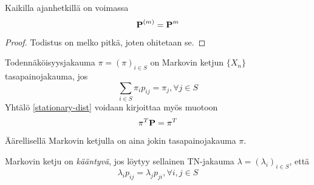 \begin{lause}
	Kaikilla ajanhetkillä on voimassa
	\begin{equation}
		\textbf{P} ^{(m)} = \textbf{P} ^m
	\end{equation}
\end{lause}
\begin{proof}
	Todistus on melko pitkä, joten ohitetaan se.
\end{proof}

\begin{maar}
	Todennäköisyysjakauma $\pi=(\pi)_{i\in S}$ on Markovin ketjun $\{X_n\}$ tasapainojakauma, jos 
	\begin{equation}\label{stationary-dist}
		\sum_{i\in S} \pi_i p_{ij}=\pi_j, \forall j\in S
	\end{equation}
	Yhtälö \ref{stationary-dist} voidaan kirjoittaa myös muotoon 
	\begin{equation}\label{stationary-dist2}
		\pi^T\textbf{P}= \pi^T
	\end{equation}
\end{maar}

\begin{lause}
	Äärellisellä Markovin ketjulla on aina jokin tasapainojakauma $\pi$.
\end{lause}

\begin{maar}\label{kaant-disk}
	Markovin ketju on \textit{kääntyvä}, jos löytyy sellainen TN-jakauma $\lambda=(\lambda_i)_{i\in S}$, että 
	\begin{equation}
		\lambda_ip_{ij}= \lambda_jp_{ji},\forall i,j\in S
	\end{equation}
\end{maar}

